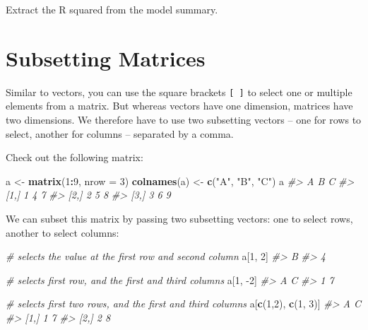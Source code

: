 \documentclass[]{book}
\newenvironment{Shaded}{\begin{snugshade}}{\end{snugshade}}
\newcommand{\CommentTok}[1]{\textcolor[rgb]{0.56,0.35,0.01}{\textit{#1}}}
\newcommand{\DataTypeTok}[1]{\textcolor[rgb]{0.13,0.29,0.53}{#1}}
\newcommand{\DecValTok}[1]{\textcolor[rgb]{0.00,0.00,0.81}{#1}}
\newcommand{\KeywordTok}[1]{\textcolor[rgb]{0.13,0.29,0.53}{\textbf{#1}}}
\newcommand{\NormalTok}[1]{#1}
\newcommand{\OperatorTok}[1]{\textcolor[rgb]{0.81,0.36,0.00}{\textbf{#1}}}
\newcommand{\StringTok}[1]{\textcolor[rgb]{0.31,0.60,0.02}{#1}}
\begin{document}
Extract the R squared from the model summary.

\hypertarget{subsetting-matrices}{%
\section{Subsetting Matrices}\label{subsetting-matrices}}

Similar to vectors, you can use the square brackets \texttt{{[}\ {]}} to select one or multiple elements from a matrix. But whereas vectors have one dimension, matrices have two dimensions. We therefore have to use two subsetting vectors -- one for rows to select, another for columns -- separated by a comma.

Check out the following matrix:

\begin{Shaded}
\begin{Highlighting}[]
\NormalTok{a <-}\StringTok{ }\KeywordTok{matrix}\NormalTok{(}\DecValTok{1}\OperatorTok{:}\DecValTok{9}\NormalTok{, }\DataTypeTok{nrow =} \DecValTok{3}\NormalTok{)}
\KeywordTok{colnames}\NormalTok{(a) <-}\StringTok{ }\KeywordTok{c}\NormalTok{(}\StringTok{"A"}\NormalTok{, }\StringTok{"B"}\NormalTok{, }\StringTok{"C"}\NormalTok{)}
\NormalTok{a}
\CommentTok{#>      A B C}
\CommentTok{#> [1,] 1 4 7}
\CommentTok{#> [2,] 2 5 8}
\CommentTok{#> [3,] 3 6 9}
\end{Highlighting}
\end{Shaded}

We can subset this matrix by passing two subsetting vectors: one to select rows, another to select columns:

\begin{Shaded}
\begin{Highlighting}[]
\CommentTok{# selects the value at the first row and second column}
\NormalTok{a[}\DecValTok{1}\NormalTok{, }\DecValTok{2}\NormalTok{] }
\CommentTok{#> B }
\CommentTok{#> 4}

\CommentTok{# selects first row, and the first and third columns}
\NormalTok{a[}\DecValTok{1}\NormalTok{, }\DecValTok{-2}\NormalTok{] }
\CommentTok{#> A C }
\CommentTok{#> 1 7}

\CommentTok{# selects first two rows, and the first and third columns}
\NormalTok{a[}\KeywordTok{c}\NormalTok{(}\DecValTok{1}\NormalTok{,}\DecValTok{2}\NormalTok{), }\KeywordTok{c}\NormalTok{(}\DecValTok{1}\NormalTok{, }\DecValTok{3}\NormalTok{)] }
\CommentTok{#>      A C}
\CommentTok{#> [1,] 1 7}
\CommentTok{#> [2,] 2 8}
\end{Highlighting}
\end{Shaded}
\end{document}
